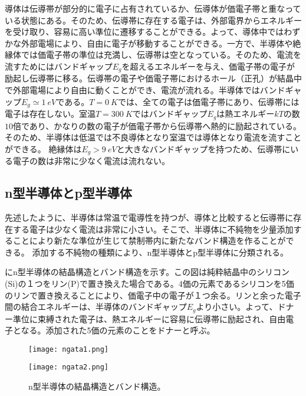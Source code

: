 導体は伝導帯が部分的に電子に占有されているか、伝導体が価電子帯と重なっている状態にある。そのため、伝導帯に存在する電子は、外部電界からエネルギーを受け取り、容易に高い準位に遷移することができる。よって、導体中ではわずかな外部電場により、自由に電子が移動することができる。一方で、半導体や絶縁体では価電子帯の準位は充満し、伝導帯は空となっている。そのため、電流を流すためにはバンドギャップ$E_g$を超えるエネルギーを与え、価電子帯の電子が励起し伝導帯に移る。伝導帯の電子や価電子帯におけるホール（正孔）が結晶中で外部電場により自由に動くことができ、電流が流れる。半導体ではバンドギャップ$E_g\simeq 1\ \si{eV}$である。$T=0\ \si{K}$では、全ての電子は価電子帯にあり、伝導帯には電子は存在しない。室温$T=300\ \si{K}$ではバンドギャップ$E_g$は熱エネルギー$kT$の数$10$倍であり、かなりの数の電子が価電子帯から伝導帯へ熱的に励起されている。そのため、半導体は低温では不良導体となり室温では導体となり電流を流すことができる。
絶縁体は$E_g>9\ \si{eV}$と大きなバンドギャップを持つため、伝導帯にいる電子の数は非常に少なく電流は流れない。

\subsection{n型半導体とp型半導体}
\label{sec:pngata}
先述したように、半導体は常温で電導性を持つが、導体と比較すると伝導帯に存在する電子は少なく電流は非常に小さい。そこで、半導体に不純物を少量添加することにより新たな準位が生じて禁制帯内に新たなバンド構造を作ることができる。
添加する不純物の種類により、n型半導体とp型半導体に分類される。

にn型半導体の結晶構造とバンド構造を示す。この図は純粋結晶中のシリコン(Si)の１つをリン(P)で置き換えた場合である。4価の元素であるシリコンを5価のリンで置き換えることにより、価電子中の電子が１つ余る。リンと余った電子間の結合エネルギーは、半導体のバンドギャップ$E_g$より小さい。よって、ドナー準位に束縛された電子は、熱エネルギーに容易に伝導帯に励起され、自由電子となる。添加された5価の元素のことをドナーと呼ぶ。
\begin{figure}[tbp]
  \begin{minipage}[b]{0.5\linewidth}
    \centering
    \texttt{[image: ngata1.png]}
  \end{minipage}
  \begin{minipage}[b]{0.5\linewidth}
    \centering
    \texttt{[image: ngata2.png]}
  \end{minipage}
  \caption[n型半導体の結晶構造とバンド構造]{n型半導体の結晶構造とバンド構造。}
  \label{fig:ngata}
\end{figure}


